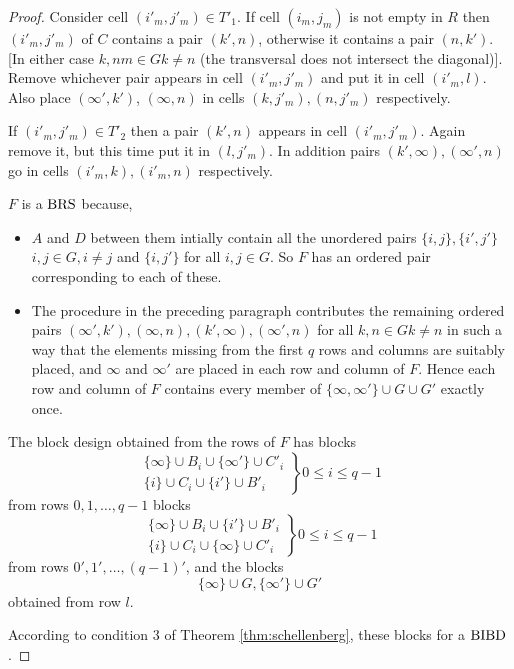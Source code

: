 \begin{proof}
Consider cell $(i'_m, j'_m) \in T'_1$. If cell $(i_m, j_m)$ is not empty in $R$ then $(i'_m, j'_m)$ of $C$ contains a pair $(k', n)$, otherwise it contains a pair $(n, k')$. [In either case $k, nm \in G k \neq n$ (the transversal does not intersect the diagonal)].
Remove whichever pair appears in cell $(i'_m, j'_m)$ and put it in cell $(i'_m, l)$.
Also place $(\infty', k')$, $(\infty, n)$ in cells $(k, j'_m), (n, j'_m)$ respectively.

If $(i'_m, j'_m) \in T'_2$ then a pair $(k', n)$ appears in cell $(i'_m, j'_m)$.
Again remove it, but this time put it in $(l, j'_m)$.
In addition pairs $(k', \infty), (\infty ', n)$ go in cells $(i'_m, k), (i'_m, n)$ respectively.

$F$ is a $\operatorname{BRS}$ because,
\begin{itemize}
  \item{$A$ and $D$ between them intially contain all the
    unordered pairs $\{i, j\}, \{i', j'\}$
    $i, j \in G, i\neq j$ and
    $\{i,j'\}$ for all $i,j \in G$. So $F$ has an
    ordered pair corresponding to each of these.}
  \item{The procedure in the preceding paragraph contributes
    the remaining ordered pairs
    $(\infty', k'),(\infty,n),(k',\infty),(\infty ',n)$ for all $k,n \in G k \neq n$
    in such a way that the
    elements missing from the first $q$ rows and columns are
    suitably placed, and $\infty$ and $\infty '$ are placed
    in each row and column of $F$.  Hence each row and
    column of $F$ contains every member of
    $\{\infty, \infty '\} \cup G \cup G'$
    exactly once.}
\end{itemize}

The block design obtained from the rows of $F$ has blocks
\begin{equation}
\left.
\begin{split}
\{\infty\} \cup B_i \cup \{\infty'\} \cup C'_i \\
\{i\} \cup C_i \cup \{i'\} \cup B'_i
\end{split}
\right \}
0 \leq i \leq q-1
\end{equation}
from rows $0, 1, \ldots, q - 1$ blocks
\begin{equation}
\left.
\begin{split}
\{\infty\} \cup B_i \cup \{i'\} \cup B'_i \\
\{i\} \cup C_i \cup \{\infty\} \cup C'_i
\end{split}
\right \}
0 \leq i \leq q-1
\end{equation}
from rows $0', 1', \ldots, (q - 1)'$, and the blocks
\begin{equation}
\{\infty\} \cup G, \{\infty '\} \cup G'
\end{equation}
obtained from row $l$.

According to condition 3 of Theorem \ref{thm:schellenberg}, these blocks for a $\operatorname{BIBD}$.
\end{proof}

